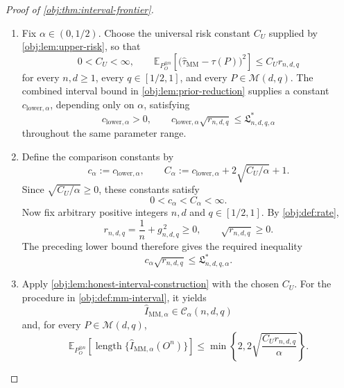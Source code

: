 \begin{proof}[Proof of \cref{obj:thm:interval-frontier}]
\begin{enumerate}
\item Fix \(\alpha\in(0,1/2)\). Choose the universal risk constant \(C_U\) supplied by \cref{obj:lem:upper-risk}, so that
\[
0<C_U<\infty,
\qquad
\mathbb E_{P_O^{\otimes n}}
\left[
\bigl(\widehat\tau_{\mathrm{MM}}-\tau(P)\bigr)^2
\right]
\le C_U r_{n,d,q}
\]
for every \(n,d\ge1\), every \(q\in[1/2,1]\), and every \(P\in\mathcal M(d,q)\).
The combined interval bound in \cref{obj:lem:prior-reduction} supplies a constant \(c_{\mathrm{lower},\alpha}\), depending only on \(\alpha\), satisfying
\[
c_{\mathrm{lower},\alpha}>0,
\qquad
c_{\mathrm{lower},\alpha}\sqrt{r_{n,d,q}}
\le \mathfrak L^*_{n,d,q,\alpha}
\]
throughout the same parameter range.

\item Define the comparison constants by
\[
c_\alpha:=c_{\mathrm{lower},\alpha},
\qquad
C_\alpha:=c_{\mathrm{lower},\alpha}
       +2\sqrt{C_U/\alpha}+1.
\]
Since \(\sqrt{C_U/\alpha}\ge0\), these constants satisfy
\[
0<c_\alpha<C_\alpha<\infty.
\]
Now fix arbitrary positive integers \(n,d\) and \(q\in[1/2,1]\). By \cref{obj:def:rate},
\[
r_{n,d,q}=\frac1n+g_{n,d,q}^{\,2}\ge0,
\qquad
\sqrt{r_{n,d,q}}\ge0.
\]
The preceding lower bound therefore gives the required inequality
\[
c_\alpha\sqrt{r_{n,d,q}}
\le \mathfrak L^*_{n,d,q,\alpha}.
\]

\item Apply \cref{obj:lem:honest-interval-construction} with the chosen \(C_U\). For the procedure in \cref{obj:def:mm-interval}, it yields
\[
\widehat I_{\mathrm{MM},\alpha}\in\mathcal C_\alpha(n,d,q)
\]
and, for every \(P\in\mathcal M(d,q)\),
\[
\mathbb E_{P_O^{\otimes n}}
\left[
\operatorname{length}\{\widehat I_{\mathrm{MM},\alpha}(O^n)\}
\right]
\le
\min\left\{2,2\sqrt{\frac{C_Ur_{n,d,q}}{\alpha}}\right\}.
\]


\end{enumerate}
\end{proof}
